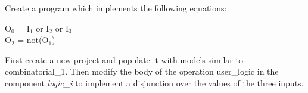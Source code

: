 \begin{exercise}
Create a program which implements the following equations:
\begin{center}
O$_0$ = I$_1$ or I$_2$ or I$_3$\\
O$_2$ = not(O$_1$)    
\end{center}
First create a new project and populate it with models similar to combinatorial\_1. Then modify the body of the operation user\_logic in the component \textit{logic\_i} to implement a disjunction over the values of the three inputs.
\end{exercise}